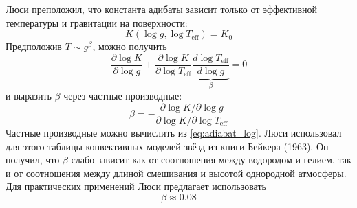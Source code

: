 Люси преположил, что константа адибаты зависит только от эффективной температуры и гравитации на поверхности:
\[
K(\log g, \log T_\text{eff}) = K_0
\]
Предположив $T \sim g^\beta$, можно получить
\[
\frac{\partial \log K}{\partial \log g}
+ \frac{\partial \log K}{\partial \log T_\text{eff}}
\underbrace{\frac{d \log T_\text{eff}}{d \log g}}_{\beta} = 0
\]
и выразить $\beta$ через частные производные:
\[
\beta = -\frac{\partial \log K / \partial \log g}{\partial \log K / \partial \log T_\text{eff}}
\]
Частные производные можно вычислить из \eqref{eq:adiabat_log}. Люси использовал для этого таблицы конвективных моделей звёзд из книги Бейкера (1963). Он получил, что $\beta$ слабо зависит как от соотношения между водородом и гелием, так и от соотношения между длиной смешивания и высотой однородной атмосферы. Для практических применений Люси предлагает использовать
\[
\beta \approx 0.08
\]


\showbib


